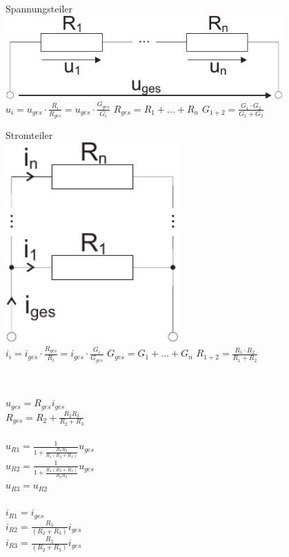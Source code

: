 \documentclass[a4paper,twocolumn,10pt]{article}
\begin{document}
\begin{minipage}[t]{0.23\textwidth}
\centering
Spannungsteiler\\
\vspace{0.3 cm}
\includegraphics[width=0.8\textwidth]{Grafiken/Spannungsteiler}\\
\vspace{0.5 cm}
$u_i=u_{ges}\cdot \frac{R_i}{R_{ges}}=u_{ges}\cdot \frac{G_{ges}}{G_i}$
$R_{ges}=R_1+...+R_n$
$G_{1+2}=\frac{G_1\cdot G_2}{G_1+G_2}$
\end{minipage}
\hfill
\begin{minipage}[t]{0.23\textwidth}
\centering
Stromteiler\\
\vspace{0.3 cm}
\includegraphics[width=0.5\textwidth]{Grafiken/Stromteiler}\\
\vspace{0.5 cm}
$i_i=i_{ges}\cdot \frac{R_{ges}}{R_i}=i_{ges}\cdot \frac{G_i}{G_{ges}}$
$G_{ges}=G_1+...+G_n$
$R_{1+2}=\frac{R_1\cdot R_2}{R_1+R_2}$
\end{minipage}
\\
\begin{minipage}{0.20\textwidth}
	$u_{ges}=R_{ges}i_{ges}$\\
	$R_{ges}=R_2+\frac{R_2R_3}{R_2+R_3}$\\\\
	$u_{R1}=\frac{1}{1+\frac{R_2 R_3}{R_1(R_2 + R_3)}}u_{ges}$\\
	$u_{R2}=\frac{1}{1+\frac{R_1(R_2+R_3)}{R_2R_3}}u_{ges}$\\
	$u_{R3}=u_{R2}$
	\\\\
	$i_{R1}=i_{ges}$\\
	$i_{R2}=\frac{R_3}{(R_2+R_3)}i_{ges}$\\
	$i_{R3}=\frac{R_2}{(R_2+R_3)}i_{ges}$
\end{minipage}
\end{document}
